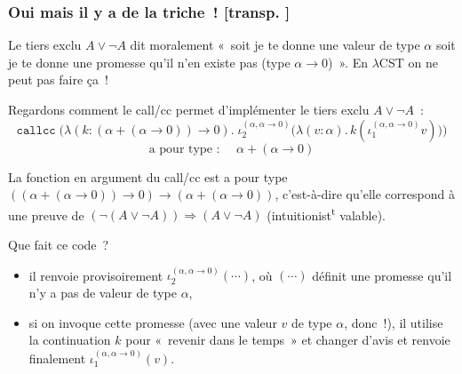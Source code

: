\documentclass[mathserif,a4paper,aspectratio=169]{beamer}
\renewcommand{\frametitle}[1]{\subsubsection*{#1 {\footnotesize[transp. \insertframenumber]}}}
\begin{document}
\begin{frame}
\frametitle{Oui mais il y a de la triche !}

{\footnotesize Le tiers exclu $A \lor \neg A$ dit moralement « soit je
  te donne une valeur de type $\alpha$ soit je te donne une promesse
  qu'il n'en existe pas (type $\alpha\to 0$) ».  En $\lambda$CST on ne
  peut pas faire ça !}

\bigskip

Regardons comment le call/cc permet d'implémenter le tiers exclu $A
\lor \neg A$ :
\[
\texttt{callcc}\;
\bigg(\lambda (k:(\alpha+(\alpha\to 0))\to 0).\;\iota^{(\alpha,\alpha\to 0)}_2\Big(\lambda (v:\alpha).\,k(\iota^{(\alpha,\alpha\to 0)}_1 v)\Big)\bigg)
\]
\[
\text{a pour type~:~}\quad
\alpha + (\alpha\to 0)
\]

{\footnotesize La fonction en argument du call/cc est a pour type
  $((\alpha + (\alpha\to 0)) \to 0) \to (\alpha + (\alpha\to 0))$,
  c'est-à-dire qu'elle correspond à une preuve de $(\neg (A\lor\neg
  A)) \Rightarrow (A\lor\neg A)$ (intuitionist\textsuperscript{t}
  valable).\par}

\bigskip

Que fait ce code ?
\begin{itemize}
\item il renvoie \alert{provisoirement} $\iota_2^{(\alpha,\alpha\to
  0)}(\cdots)$, où $(\cdots)$ définit une promesse qu'il n'y a pas de
  valeur de type $\alpha$,
\item si on invoque cette promesse (avec une valeur $v$ de type
  $\alpha$, donc !), il utilise la continuation $k$ pour « revenir
  dans le temps » et changer d'avis et renvoie finalement
  $\iota_1^{(\alpha,\alpha\to 0)}(v)$.
\end{itemize}

\end{frame}
%
\end{document}

